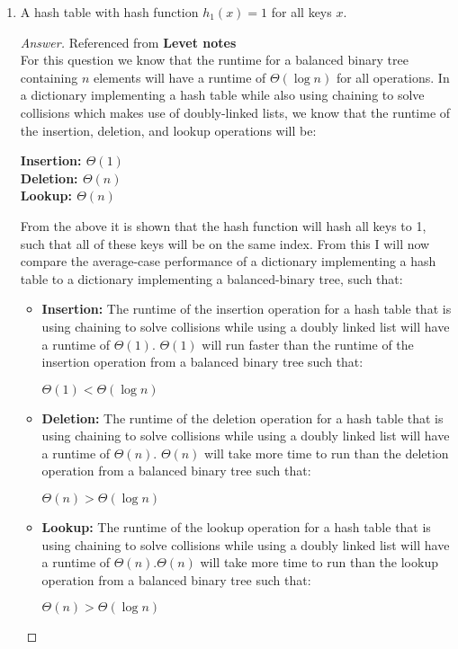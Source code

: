 \documentclass[11pt]{article}
\theoremstyle{definition}
\theoremstyle{definition}
\theoremstyle{definition}
\begin{document}
    \begin{enumerate}[label=(\alph*)]
    \item A hash table with hash function $h_1(x)=1$ for all keys $x$.
    
    \begin{proof}[Answer] Referenced from \textbf{Levet notes}\\
        For this question we know that the runtime for a balanced binary tree containing $n$ elements will have a runtime of $\Theta(\log n)$ for all operations. In a dictionary implementing a hash table while also using chaining to solve collisions which makes use of doubly-linked lists, we know that the runtime of the insertion, deletion, and lookup operations will be: \\
\begin{center}
\textbf{Insertion: $\Theta(1)$} \\
\textbf{Deletion: $\Theta(n)$} \\
\textbf{Lookup: $\Theta(n)$}
\end{center}
From the above it is shown that the hash function will hash all keys to 1, such that all of these keys will be on the same index.
From this I will now compare the average-case performance of a dictionary implementing a hash table to a dictionary implementing a balanced-binary tree, such that: \\
\begin{itemize}
\item \textbf{Insertion:} The runtime of the insertion operation for a hash table that is using chaining to solve collisions while using a doubly linked list will have a runtime of $\Theta(1)$. $\Theta(1)$ will run faster than the runtime of the insertion operation from a balanced binary tree such that: \\
\begin{center}
$\Theta(1) < \Theta(\log n)$
\end{center}
\item \textbf{Deletion:} The runtime of the deletion operation for a hash table that is using chaining to solve collisions while using a doubly linked list will have a runtime of $\Theta(n)$. $\Theta(n)$ will take more time to run than the deletion operation from a balanced binary tree such that: \\
\begin{center}
$\Theta(n) >\Theta(\log n)$
\end{center}
\item \textbf{Lookup:} The runtime of the lookup operation for a hash table that is using chaining to solve collisions while using a doubly linked list will have a runtime of $\Theta(n)$.$\Theta(n)$ will take more time to run than the lookup operation from a balanced binary tree such that: \\
\begin{center}
$\Theta(n) > \Theta(\log n)$
\end{center}
\end{itemize}
    \end{proof}
    

\end{enumerate}
\end{document}
